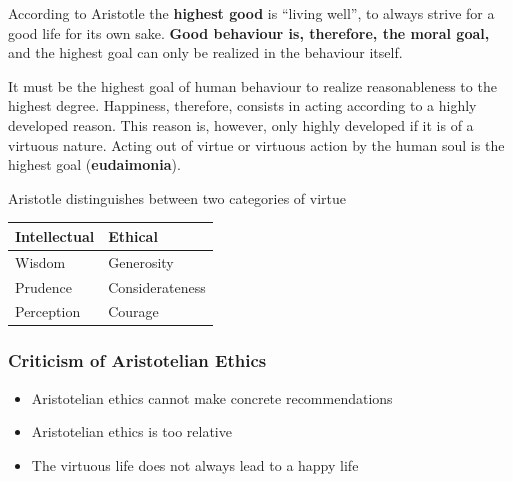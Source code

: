 \documentclass[11pt]{article}
\theoremstyle{definition}
\begin{document}
According to Aristotle the \textbf{highest good} is \textquotedblleft living well\textquotedblright, to always strive for a good life for its own sake. \textbf{Good behaviour is, therefore, the moral goal,} and the highest goal can only be realized in the behaviour itself.

It must be the highest goal of human behaviour to realize reasonableness to the highest degree. Happiness, therefore, consists in acting according to a highly developed reason. This reason is, however, only highly developed if it is of a virtuous nature. Acting out of virtue or virtuous action by the human soul is the highest goal (\textbf{eudaimonia}).

Aristotle distinguishes between two categories of virtue
\begin{tabularx}{\linewidth}{l @{\hskip 2cm} l}
	\textbf{Intellectual} & \textbf{Ethical}\\
	\hline
	Wisdom & Generosity \\
	Prudence & Considerateness \\
	Perception & Courage \\
\end{tabularx}

\subsubsection{Criticism of Aristotelian Ethics}
\begin{itemize}[label=-]
	\item Aristotelian ethics cannot make concrete recommendations
	\item Aristotelian ethics is too relative
	\item The virtuous life does not always lead to a happy life
\end{itemize}
\end{document}
